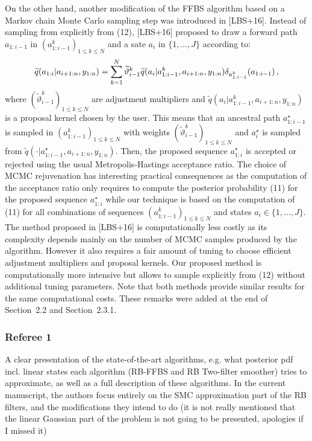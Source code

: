{On the other hand, another modification of the FFBS algorithm based on a Markov chain Monte Carlo sampling step was introduced in [LBS+16]. Instead of sampling from  explicitly from (12), [LBS+16] proposed to draw a forward path $a_{1:i-1}$ in $(a^k_{1:i-1})_{1\le k \le N}$ and a sate $a_i$ in $\{1,\ldots,J\}$ according to:
\[
\widetilde{q}(a_{1:i}|a_{i+1:n},y_{1:n}) = \sum_{k=1}^N \widetilde{\vartheta}^k_{i-1}\widetilde{q}(a_{i}|a^k_{1:i-1},a_{i+1:n},y_{1:n})\delta_{a^k_{1:i-1}}(a_{1:i-1})\,,
\]
where $(\widetilde{\vartheta}^k_{i-1})_{1\le k \le N}$ are adjustment multipliers and $\widetilde{q}(a_{i}|a^k_{1:i-1},a_{i+1:n},y_{1:n})$ is a proposal kernel chosen by the user. This means that an ancestral path $a^{\star}_{1:i-1}$ is sampled in $(a^k_{1:i-1})_{1\le k \le N}$ with weights $(\widetilde{\vartheta}^k_{i-1})_{1\le k \le N}$ and $a^{\star}_i$ is sampled from $\widetilde{q}(\cdot|a^{\star}_{1:i-1},a_{i+1:n},y_{1:n})$. Then, the proposed sequence $a^{\star}_{1:i}$ is accepted or rejected using the usual Metropolis-Hastings acceptance ratio. The choice of MCMC rejuvenation has interesting practical consequences as the computation of the acceptance ratio only requires to compute the posterior probability (11) for the proposed sequence $a^{\star}_{1:i}$ while our technique is based on the computation of  (11) for all combinations of sequences $(a^{k}_{1:i-1})_{1\le k \le N}$ and states $a_i\in\{1,\ldots,J\}$. The method proposed in [LBS+16] is computationally less costly as its complexity depends mainly on the number of MCMC samples produced by the algorithm. However it also requires a fair amount of tuning to choose efficient adjustment multipliers and proposal kernels. Our proposed method is computationally more intensive but allows to sample explicitly from (12) without additional tuning parameters. Note that both methods provide similar results for the same computational costs.
These remarks were added at the end of Section~2.2 and Section~2.3.1.
}

\subsubsection*{Referee 1}
A clear presentation of the state-of-the-art algorithms, e.g. what posterior pdf incl. linear states each algorithm (RB-FFBS and RB Two-filter smoother) tries to approximate, as well as a full description of these algorithms. In the current manuscript, the authors focus entirely on the SMC approximation part of the RB filters, and the modifications they intend to do (it is not really mentioned that the linear Gaussian part of the problem is not going to be presented, apologies if I missed it)

